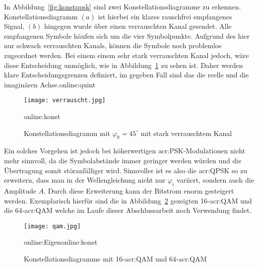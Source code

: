 In Abbildung~\ref{fig:konstqpsk} sind zwei Konstellationsdiagramme zu erkennen. Konstellationsdiagramm $(a)$ ist hierbei ein klares rauschfrei empfangenes Signal, $(b)$ hingegen wurde über einen verrauschten Kanal gesendet. Alle empfangenen Symbole häufen sich um die vier Symbolpunkte. Aufgrund des hier nur schwach verrauschten Kanals, können die Symbole noch problemlos zugeordnet werden. Bei einem einem sehr stark verrauschten Kanal jedoch, wäre diese Entscheidung unmöglich, wie in Abbildung~\ref{fig:verrauscht} zu sehen ist. Daher werden klare Entscheidungsgrenzen definiert, im gegeben Fall sind das die reelle und die imaginären Achse.\gls{online:quint}

\begin{figure}[H]
	\centering
	\texttt{[image: verrauscht.jpg]}
	\caption[Konstellationsdiagramm mit $\varphi_{0}=45^\circ$ mit stark verrauschtem Kanal]{Konstellationsdiagramm mit $\varphi_{0}=45^\circ$ mit stark verrauschtem Kanal} 
	\gls{online:konst}
	\label{fig:verrauscht}
\end{figure}

Ein solches Vorgehen ist jedoch bei höherwertigen \gls{acr:PSK}-Modulationen nicht mehr sinnvoll, da die Symbolabstände immer geringer werden würden und die Übertragung somit störanfälliger wird. Sinnvoller ist es also die \gls{acr:QPSK} so zu erweitern, dass man in der Wellengleichung nicht nur $\varphi_{i}$ variiert, sondern auch die Amplitude $A$. Durch diese Erweiterung kann der Bitstrom enorm gesteigert werden. Exemplarisch hierfür sind die in Abbildung~\ref{fig:qam} gezeigten 16-\gls{acr:QAM} und die 64-\gls{acr:QAM} welche im Laufe dieser Abschlussarbeit noch Verwendung findet.

\begin{figure}[H]
	\centering
	\texttt{[image: qam.jpg]}
	\caption[Konstellationsdiagramm 16-\gls{acr:QAM} und 64-\gls{acr:QAM}]{Konstellationsdiagramme mit  16-\gls{acr:QAM} und 64-\gls{acr:QAM}} 
	\gls{online:Eigen}\gls{online:konst}
	\label{fig:qam}
\end{figure}



